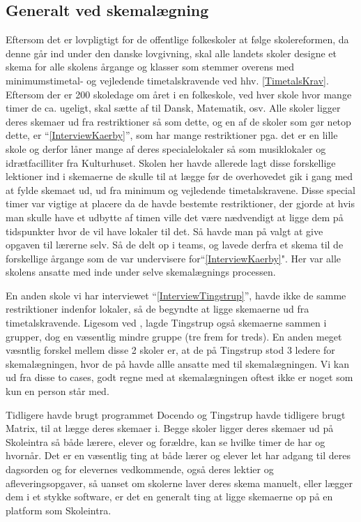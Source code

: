 \subsection{Generalt ved skemalægning}
Eftersom det er lovpligtigt for de offentlige folkeskoler at følge skolereformen, da denne går ind under den danske lovgivning, skal alle landets skoler designe et skema for alle skolens årgange og klasser som stemmer overens med minimumstimetal- og vejledende timetalskravende ved hhv. \ref{TimetalsKrav}. Eftersom der er 200 skoledage om året i en folkeskole\cite{elevers_timetal}, ved hver skole hvor mange timer de ca. ugeligt, skal sætte af til Dansk, Matematik, osv. Alle skoler ligger deres skemaer ud fra restriktioner så som dette, og en af de skoler som gør netop dette, er \school ``\ref{InterviewKaerby}'', som har mange restriktioner pga. det er en lille skole og derfor låner mange af deres specialelokaler så som musiklokaler og idrætfacilliter fra Kulturhuset. Skolen her havde allerede lagt disse forskellige lektioner ind i skemaerne de skulle til at lægge før de overhovedet gik i gang med at fylde skemaet ud, ud fra minimum og vejledende timetalskravene. Disse special timer var vigtige at placere da de havde bestemte restriktioner, der gjorde at hvis man skulle have et udbytte af timen ville det være nædvendigt at ligge dem på tidspunkter hvor de vil have lokaler til det. Så havde man på \school valgt at give opgaven til lærerne selv. Så de delt op i teams, og lavede derfra et skema til de forskellige årgange som de var undervisere for``\ref{InterviewKaerby}". Her var alle skolens ansatte med inde under selve skemalægnings processen. 

En anden skole vi har interviewet ``\ref{InterviewTingstrup}'', havde ikke de samme restriktioner indenfor lokaler, så de begyndte at ligge skemaerne ud fra timetalskravende. Ligesom ved \school, lagde Tingstrup også skemaerne sammen i grupper, dog en væsentlig mindre gruppe (tre frem for treds). En anden meget væsntlig forskel mellem disse 2 skoler er, at de på Tingstrup stod 3 ledere for skemalægningen, hvor de på \school havde allle ansatte med til skemalægningen. Vi kan ud fra disse to cases, godt regne med at skemalægningen oftest ikke er noget som kun en person står med.

Tidligere havde \school brugt programmet Docendo og Tingstrup havde tidligere brugt Matrix, til at lægge deres skemaer i. Begge skoler ligger deres skemaer ud på Skoleintra så både lærere, elever og forældre, kan se hvilke timer de har og hvornår. Det er en væsentlig ting at både lærer og elever let har adgang til deres dagsorden og for elevernes vedkommende, også deres lektier og afleveringsopgaver, så uanset om skolerne laver deres skema manuelt, eller lægger dem i et stykke software, er det en generalt ting at ligge skemaerne op på en platform som Skoleintra.
